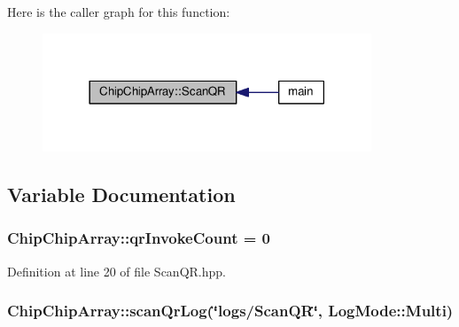 Here is the caller graph for this function\+:
\nopagebreak
\begin{figure}[H]
\begin{center}
\leavevmode
\includegraphics[width=278pt]{namespaceChipChipArray_a6c7465049b5d408e1a238b6d8ffa887d_icgraph}
\end{center}
\end{figure}




\subsection{Variable Documentation}
\hypertarget{namespaceChipChipArray_a3b2a3c0ffa9f53021293aeb4955d2fef}{
\subsubsection[{qr\+Invoke\+Count}]{ Chip\+Chip\+Array\+::qr\+Invoke\+Count = 0}}\label{namespaceChipChipArray_a3b2a3c0ffa9f53021293aeb4955d2fef}


Definition at line 20 of file Scan\+Q\+R.\+hpp.

\hypertarget{namespaceChipChipArray_ab5c6290951637c25a5422707020fb3a8}{
\subsubsection[{scan\+Qr\+Log}]{ Chip\+Chip\+Array\+::scan\+Qr\+Log(\char`\"{}logs/{\bf Scan\+Q\+R}\char`\"{}, Log\+Mode\+::\+Multi)}}\label{namespaceChipChipArray_ab5c6290951637c25a5422707020fb3a8}
